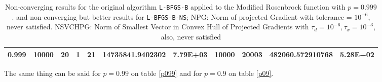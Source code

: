 \begin{table}
\begin{center}
\begin{tabular}{|l|l|l|l|l|l|l|l|l|l|l|}
      0.999 & 10000 & 20 & 1 & 21 & 14735841.9402302 & 7.79E+03 & 10000 & 20003 & 482060.572910768 & 5.28E+02\\
      \hline
    \end{tabular}
    \caption[A value where \texttt{L-BFGS-B-NS} is supposed to fail. $p = 0.999$]{Non-converging results for the original algorithm \texttt{L-BFGS-B} applied to the Modified Rosenbrock function with $p = 0.999$.  and non-converging but better results for \texttt{L-BFGS-B-NS}; NPG: Norm of projected Gradient with tolerance = $10^{-6}$, never satisfied. NSVCHPG: Norm of Smallest Vector in Convex Hull of Projected Gradients with $\tau_d = 10^{-6}, \tau_x = 10^{-3}$, also, never satisfied}
    \label{p0999}
  \end{center}
\end{table}

The same thing can be said for $p = 0.99$ on table \ref{p099} and for $p = 0.9$ on table \ref{p09}.

